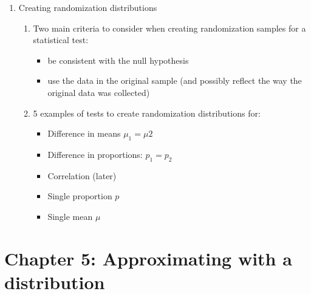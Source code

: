 \documentclass{article}
\begin{document}
\begin{enumerate}
\item Creating randomization distributions
\begin{enumerate}
\item Two main criteria to consider when creating randomization samples for a statistical test:
\begin{itemize}
\item be consistent with the null hypothesis
\item use the data in the original sample (and possibly reflect the way the original data was collected)
\end{itemize}
\item 5 examples of tests to create randomization distributions for:
\begin{itemize}
\item Difference in means $\mu_1 = \mu2$
\item Difference in proportions: $p_1=p_2$
\item Correlation (later)
\item Single proportion $p$
\item Single mean $\mu$
\end{itemize}
\end{enumerate}

\end{enumerate}

\section{Chapter 5: Approximating with a distribution}

\end{document}
